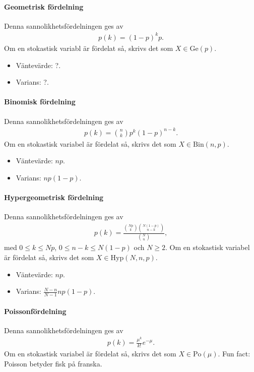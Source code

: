 \paragraph{Geometrisk fördelning}
Denna sannolikhetsfördelningen ges av
\begin{align*}
	p(k) = (1 - p)^{k}p.
\end{align*}
Om en stokastisk variabl är fördelat så, skrivs det som $X\in\text{Ge}(p)$.

\begin{itemize}
	\item Väntevärde: ?.
	\item Varians: ?.
\end{itemize}

\paragraph{Binomisk fördelning}
Denna sannolikhetsfördelningen ges av
\begin{align*}
	p(k) = \binom{n}{k}p^{k}(1 - p)^{n - k}.
\end{align*}
Om en stokastisk variabel är fördelat så, skrivs det som $X\in\text{Bin}(n, p)$.

\begin{itemize}
	\item Väntevärde: $np$.
	\item Varians: $np(1 - p)$.
\end{itemize}

\paragraph{Hypergeometrisk fördelning}
Denna sannolikhetsfördelningen ges av
\begin{align*}
	p(k) = \frac{\binom{Np}{k}\binom{N(1 - p)}{n - k}}{\binom{N}{n}},
\end{align*}
med $0\leq k\leq Np$, $0\leq n - k\leq N(1 - p)$ och $N\geq 2$. Om en stokastisk variabel är fördelat så, skrivs det som $X\in\text{Hyp}(N, n, p)$.

\begin{itemize}
	\item Väntevärde: $np$.
	\item Varians: $\frac{N - n}{N - 1}np(1 - p)$.
\end{itemize}

\paragraph{Poissonfördelning}
Denna sannolikhetsfördelningen ges av
\begin{align*}
	p(k) = \frac{\mu^k}{k!}e^{-\mu}.
\end{align*}
Om en stokastisk variabel är fördelat så, skrivs det som $X\in\text{Po}(\mu)$. Fun fact: Poisson betyder fisk på franska.

